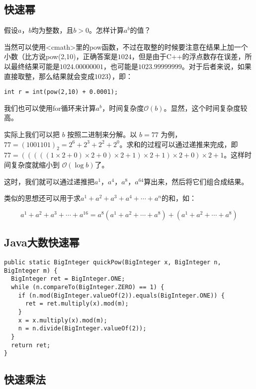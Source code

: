 \subsection{快速幂}

假设$a$，$b$均为整数，且$b>0$。怎样计算$a^b$的值？

当然可以使用<cmath>里的pow函数，不过在取整的时候要注意在结果上加一个小数（比方说pow(2,10)，正确答案是$1024$，但是由于C++的浮点数存在误差，所以最终结果可能是$1024.00000001$，也可能是$1023.99999999$。对于后者来说，如果直接取整，那么结果就会变成$1023$），即：

\begin{lstlisting}
int r = int(pow(2,10) + 0.0001);
\end{lstlisting}

我们也可以使用for循环来计算$a^b$，时间复杂度$\mathcal{O}(b)$。显然，这个时间复杂度较高。

实际上我们可以把 $b$ 按照二进制来分解。以 $b=77$ 为例，$77=(1001101)_{2}=2^{6}+2^{3}+2^{2}+2^{0}$。求和的过程可以通过递推来完成，即 $77=(((((1\times 2+0)\times 2+0)\times 2+1)\times 2+1)\times 2+0)\times 2+1$。这样时间复杂度就缩小到 $\mathcal{O}(\log b)$了。

这时，我们就可以通过递推把$a^{1}$，$a^{4}$，$a^{8}$，$a^{64}$算出来，然后将它们组合成结果。



类似的思想还可以用于求$a^{1}+a^{2}+a^{3}+a^{4}+ \cdots +a^{n}$的和，如：

\begin{equation}
  a^{1}+a^{2}+a^{3}+\cdots +a^{{16}}=a^{8}(a^{1}+a^{2}+\cdots +a^{8})+(a^{1}+a^{2}+\cdots +a^{8})
\end{equation}

\subsection{Java大数快速幂}

\begin{lstlisting}
public static BigInteger quickPow(BigInteger x, BigInteger n, BigInteger m) {
  BigInteger ret = BigInteger.ONE;
  while (n.compareTo(BigInteger.ZERO) == 1) {
    if (n.mod(BigInteger.valueOf(2)).equals(BigInteger.ONE)) {
      ret = ret.multiply(x).mod(m);
    }
    x = x.multiply(x).mod(m);
    n = n.divide(BigInteger.valueOf(2));
  }
  return ret;
}
\end{lstlisting}

\subsection{快速乘法}


